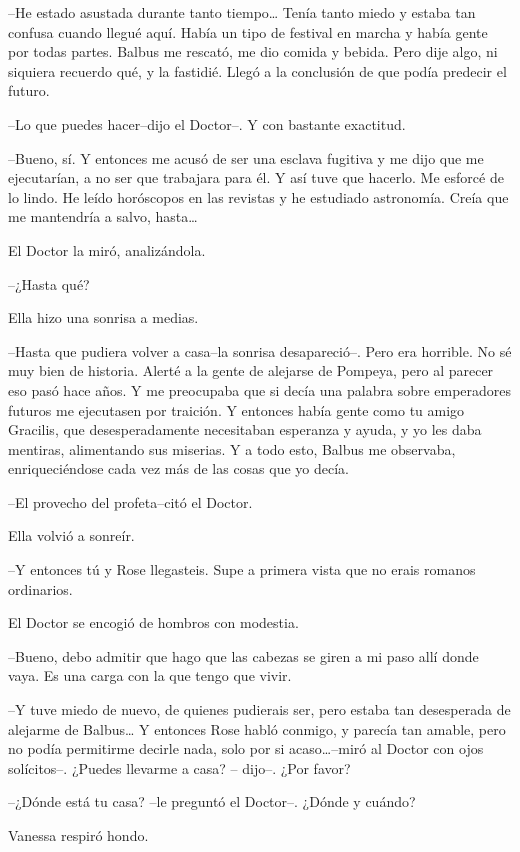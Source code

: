--He estado asustada durante tanto tiempo\ldots{} Tenía tanto miedo y
estaba tan confusa cuando llegué aquí. Había un tipo de festival en
marcha y había gente por todas partes. Balbus me rescató, me dio comida
y bebida. Pero dije algo, ni siquiera recuerdo qué, y la fastidié. Llegó
a la conclusión de que podía predecir el futuro.

--Lo que puedes hacer--dijo el Doctor--. Y con bastante exactitud.

--Bueno, sí. Y entonces me acusó de ser una esclava fugitiva y me dijo
que me ejecutarían, a no ser que trabajara para él. Y así tuve que
hacerlo. Me esforcé de lo lindo. He leído horóscopos en las revistas y
he estudiado astronomía. Creía que me mantendría a salvo, hasta\ldots{}

El Doctor la miró, analizándola.

--¿Hasta qué?

Ella hizo una sonrisa a medias.

--Hasta que pudiera volver a casa--la sonrisa desapareció--. Pero era
horrible. No sé muy bien de historia. Alerté a la gente de alejarse de
Pompeya, pero al parecer eso pasó hace años. Y me preocupaba que si
decía una palabra sobre emperadores futuros me ejecutasen por traición.
Y entonces había gente como tu amigo Gracilis, que desesperadamente
necesitaban esperanza y ayuda, y yo les daba mentiras, alimentando sus
miserias. Y a todo esto, Balbus me observaba, enriqueciéndose cada vez
más de las cosas que yo decía.

--El provecho del profeta--citó el Doctor.

Ella volvió a sonreír.

--Y entonces tú y Rose llegasteis. Supe a primera vista que no erais
romanos ordinarios.

El Doctor se encogió de hombros con modestia.

--Bueno, debo admitir que hago que las cabezas se giren a mi paso allí
donde vaya. Es una carga con la que tengo que vivir.

--Y tuve miedo de nuevo, de quienes pudierais ser, pero estaba tan
desesperada de alejarme de Balbus\ldots{} Y entonces Rose habló conmigo,
y parecía tan amable, pero no podía permitirme decirle nada, solo por si
acaso\ldots{}--miró al Doctor con ojos solícitos--. ¿Puedes llevarme a
casa? -- dijo--. ¿Por favor?

--¿Dónde está tu casa? --le preguntó el Doctor--. ¿Dónde y cuándo?

Vanessa respiró hondo.

